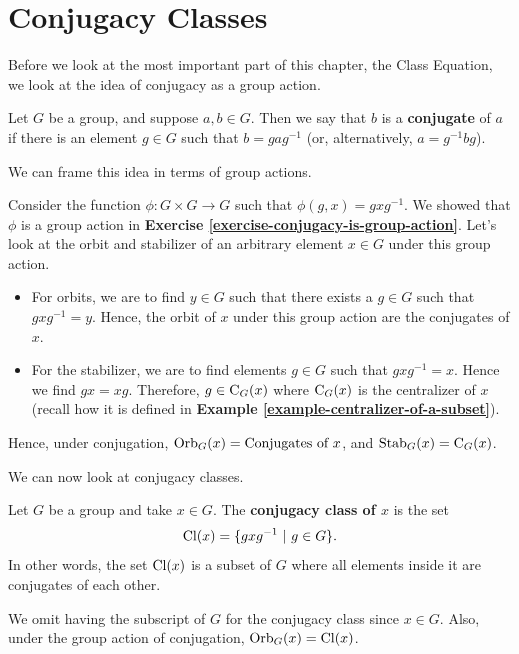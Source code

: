 \section{Conjugacy Classes}
Before we look at the most important part of this chapter, the Class Equation, we look at the idea of conjugacy as a group action.
\begin{definition}
    Let $G$ be a group, and suppose $a, b \in G$. Then we say that $b$ is a \textbf{conjugate} of $a$ if there is an element $g \in G$ such that $b = gag^{-1}$ (or, alternatively, $a=g^{-1}bg$).
\end{definition}
We can frame this idea in terms of group actions.

Consider the function $\phi: G\times G\to G$ such that $\phi(g, x) = gxg^{-1}$. We showed that $\phi$ is a group action in \textbf{Exercise \ref{exercise-conjugacy-is-group-action}}. Let's look at the orbit and stabilizer of an arbitrary element $x \in G$ under this group action.
\begin{itemize}
    \item For orbits, we are to find $y \in G$ such that there exists a $g \in G$ such that $gxg^{-1} = y$. Hence, the orbit of $x$ under this group action are the conjugates of $x$.
    \item For the stabilizer, we are to find elements $g \in G$ such that $gxg^{-1} = x$. Hence we find $gx = xg$. Therefore, $g \in \mathrm{C}_{G}(x)$ where $\mathrm{C}_{G}(x)$ is the centralizer of $x$ (recall how it is defined in \textbf{Example \ref{example-centralizer-of-a-subset}}).
\end{itemize}

Hence, under conjugation, $\mathrm{Orb}_{G}(x) = \text{Conjugates of }x$, and $\mathrm{Stab}_{G}(x) = \mathrm{C}_{G}(x)$.

We can now look at conjugacy classes.
\begin{definition}
    Let $G$ be a group and take $x \in G$. The \textbf{conjugacy class of $x$} is the set
    \[
        \mathrm{Cl}(x) = \{gxg^{-1} \ | \ g \in G\}.
    \]
    In other words, the set $\mathrm{Cl}(x)$ is a subset of $G$ where all elements inside it are conjugates of each other.
\end{definition}
\begin{remark}
    We omit having the subscript of $G$ for the conjugacy class since $x \in G$. Also, under the group action of conjugation, $\mathrm{Orb}_{G}(x) = \mathrm{Cl}(x)$.
\end{remark}

